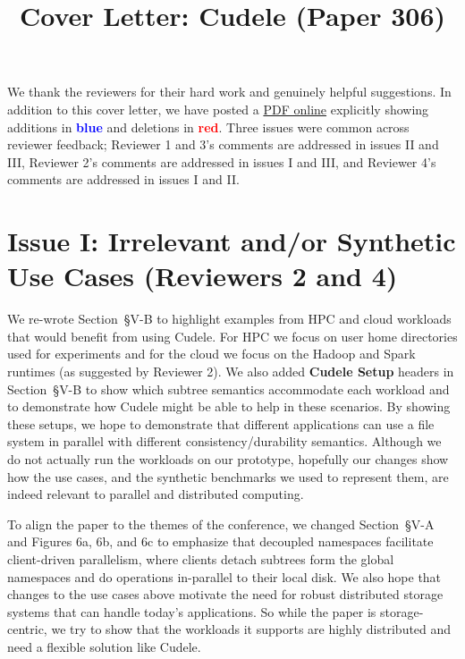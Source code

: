 \documentclass[onecolumn,conference]{IEEEtran}
\begin{document}
\title{Cover Letter: Cudele (Paper 306)}
\maketitle

We thank the reviewers for their hard work and genuinely helpful suggestions.
In addition to this cover letter, we have posted a
\href{https://github.com/michaelsevilla/cudele-popper/blob/master/paper/diff.pdf}{PDF
online} explicitly showing additions in \textcolor{blue}{\textbf{blue}} and
deletions in \textcolor{red}{\textbf{red}}. Three issues were common across
reviewer feedback; Reviewer 1 and 3's comments are addressed in issues II and
III, Reviewer 2's comments are addressed in issues I and III, and Reviewer 4's
comments are addressed in issues I and II.  

\section*{Issue I: Irrelevant and/or Synthetic Use Cases (Reviewers 2 and 4)}

We re-wrote Section~{\S}V-B to highlight examples from HPC and cloud workloads
that would benefit from using Cudele. For HPC we focus on user home directories
used for experiments and for the cloud we focus on the Hadoop and Spark
runtimes (as suggested by Reviewer 2).  We also added \textbf{Cudele Setup}
headers in Section~{\S}V-B to show which subtree semantics accommodate each
workload and to demonstrate how Cudele might be able to help in these
scenarios.  By showing these setups, we hope to demonstrate that different
applications can use a file system in parallel with different
consistency/durability semantics.  Although we do not actually run the
workloads on our prototype, hopefully our changes show how the use cases, and
the synthetic benchmarks we used to represent them, are indeed relevant to
parallel and distributed computing.

To align the paper to the themes of the conference, we changed Section~{\S}V-A
and Figures 6a, 6b, and 6c to emphasize that decoupled namespaces facilitate
client-driven parallelism, where clients detach subtrees form the global namespaces
and do operations in-parallel to their local disk. We also hope that changes to
the use cases above motivate the need for robust distributed storage systems
that can handle today's applications.  So while the paper is storage-centric,
we try to show that the workloads it supports are highly distributed and need a
flexible solution like Cudele.  
\end{document}
